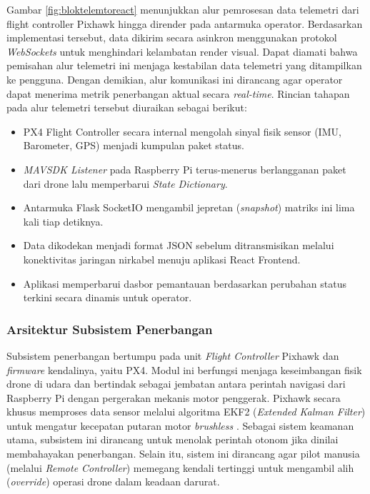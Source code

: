 \begin{enumerate}
	Gambar \ref{fig:bloktelemtoreact} menunjukkan alur pemrosesan data telemetri dari flight controller Pixhawk hingga dirender pada antarmuka operator. Berdasarkan implementasi tersebut, data dikirim secara asinkron menggunakan protokol \textit{WebSockets} untuk menghindari kelambatan render visual. Dapat diamati bahwa pemisahan alur telemetri ini menjaga kestabilan data telemetri yang ditampilkan ke pengguna. Dengan demikian, alur komunikasi ini dirancang agar operator dapat menerima metrik penerbangan aktual secara \textit{real-time}. Rincian tahapan pada alur telemetri tersebut diuraikan sebagai berikut:
	
	\begin{itemize}
		\item PX4 Flight Controller secara internal mengolah sinyal fisik sensor (IMU, Barometer, GPS) menjadi kumpulan paket status.
		\item \textit{MAVSDK Listener} pada Raspberry Pi terus-menerus berlangganan paket dari drone lalu memperbarui \textit{State Dictionary}.
		\item Antarmuka Flask SocketIO mengambil jepretan (\textit{snapshot}) matriks ini lima kali tiap detiknya.
		\item Data dikodekan menjadi format JSON sebelum ditransmisikan melalui konektivitas jaringan nirkabel menuju aplikasi React Frontend.
		\item Aplikasi memperbarui dasbor pemantauan berdasarkan perubahan status terkini secara dinamis untuk operator.
	\end{itemize}
\end{enumerate}
\subsubsection{Arsitektur Subsistem Penerbangan}
Subsistem penerbangan bertumpu pada unit \textit{Flight Controller} Pixhawk dan \textit{firmware} kendalinya, yaitu PX4. Modul ini berfungsi menjaga keseimbangan fisik drone di udara dan bertindak sebagai jembatan antara perintah navigasi dari Raspberry Pi dengan pergerakan mekanis motor penggerak. Pixhawk secara khusus memproses data sensor melalui algoritma EKF2 (\textit{Extended Kalman Filter}) untuk mengatur kecepatan putaran motor \textit{brushless} \cite{dangelo2024_template_based_px4}. Sebagai sistem keamanan utama, subsistem ini dirancang untuk menolak perintah otonom jika dinilai membahayakan penerbangan. Selain itu, sistem ini dirancang agar pilot manusia (melalui \textit{Remote Controller}) memegang kendali tertinggi untuk mengambil alih (\textit{override}) operasi drone dalam keadaan darurat.

